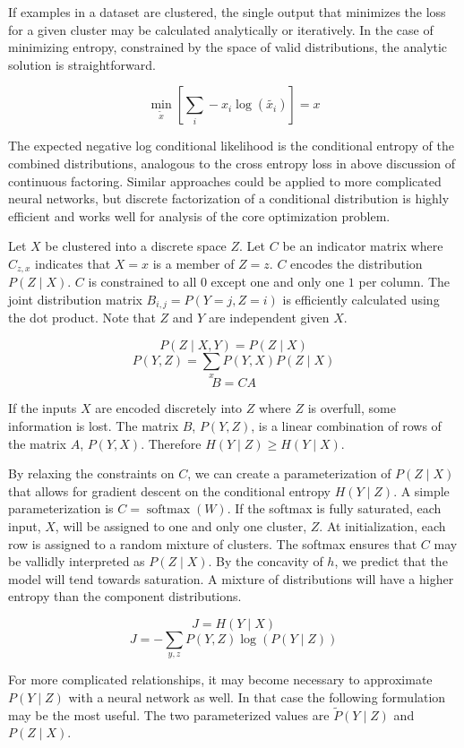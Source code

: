 \documentclass[11pt,letterpaper]{article}
\begin{document}
If examples in a dataset are clustered, the single output that minimizes the loss for a given cluster may be calculated analytically or iteratively. In the case of minimizing entropy, constrained by the space of valid distributions, the analytic solution is straightforward.

$$\min_{\tilde{x}}[\sum_i-x_i \log(\tilde{x_i})] = x$$

The expected negative log conditional likelihood is the conditional entropy of the combined distributions, analogous to the cross entropy loss in above discussion of continuous factoring. Similar approaches could be applied to more complicated neural networks, but discrete factorization of a conditional distribution is highly efficient and works well for analysis of the core optimization problem.

Let $X$ be clustered into a discrete space $Z$. Let $C$ be an indicator matrix where $C_{z,x}$ indicates that $X=x$ is a member of $Z=z$. $C$ encodes the distribution $P(Z \mid X)$. $C$ is constrained to all $0$ except one and only one $1$ per column. The joint distribution matrix $B_{i,j}=P(Y=j,Z=i)$ is efficiently calculated using the dot product. Note that $Z$ and $Y$ are independent given $X$.

$$P(Z \mid X,Y) = P(Z \mid X)$$
$$P(Y,Z) = \sum_x P(Y,X) P(Z \mid X)$$
$$B = C A $$ 

If the inputs $X$ are encoded discretely into $Z$ where $Z$ is overfull, some information is lost.  The matrix $B$, $P(Y,Z)$, is a linear combination of rows of the matrix $A$, $P(Y,X)$. Therefore $H(Y \mid Z) \ge H(Y \mid X)$. 

By relaxing the constraints on $C$, we can create a parameterization of $P(Z \mid X)$ that allows for gradient descent on the conditional entropy $H(Y\mid Z)$. A simple parameterization
is $C=\operatorname{softmax}(W)$. If the softmax is fully saturated, each input, $X$, will be assigned to one and only one cluster, $Z$. At initialization, each row is assigned to a random mixture of clusters. The softmax ensures that $C$ may be vallidly interpreted as $P(Z \mid X)$. By the concavity of $h$, we predict that the model will tend towards saturation. A mixture of distributions will have a higher entropy than the component distributions.

$$ J = H(Y \mid X) $$
$$ J = - \sum_{y,z} P(Y, Z) \log( P(Y \mid Z)) $$

For more complicated relationships, it may become necessary to approximate $P(Y \mid Z)$ with a neural network as well. In that case the following formulation may be the most useful. The two parameterized values are $\tilde{P}(Y \mid Z)$ and $P(Z \mid X)$.
\end{document}
